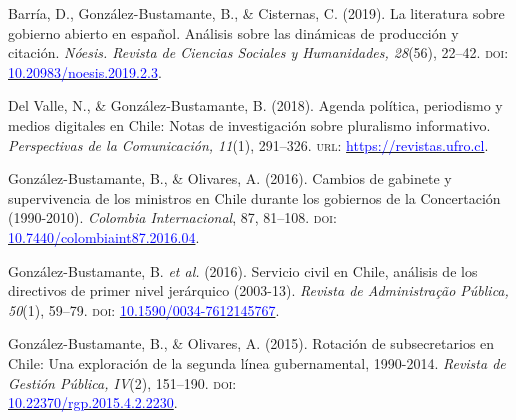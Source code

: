 \begin{publications}
\begin{benumerate}{9}
\item{\small Barría, D., González-Bustamante, B., \& Cisternas, C. (2019). La literatura sobre gobierno abierto en español. Análisis sobre las dinámicas de producción y citación. {\itshape Nóesis. Revista de Ciencias Sociales y Humanidades, 28}(56), 22--42. {\scshape doi}: \href{http://dx.doi.org/10.20983/noesis.2019.2.3}{\textcolor{blue}{10.20983/noesis.2019.2.3}}.}\vspace{1mm}

\item{\small Del Valle, N., \& González-Bustamante, B. (2018). Agenda política, periodismo y medios digitales en Chile: Notas de investigación sobre pluralismo informativo. {\itshape Perspectivas de la Comunicación, 11}(1), 291--326. {\scshape url:} \href{https://revistas.ufro.cl/ojs/index.php/perspectivas/article/view/1146}{\textcolor{blue}{https://revistas.ufro.cl}}.}\vspace{1mm}

\item{\small González-Bustamante, B., \& Olivares, A. (2016). Cambios de gabinete y supervivencia de los ministros en Chile durante los gobiernos de la Concertación (1990-2010). {\itshape Colombia Internacional}, 87, 81--108. {\scshape doi}: \\ \href{https://doi.org/10.7440/colombiaint87.2016.04}{\textcolor{blue}{10.7440/colombiaint87.2016.04}}.}\vspace{1mm}

\item{\small González-Bustamante, B. {\itshape et al.} (2016). Servicio civil en Chile, análisis de los directivos de primer nivel jerárquico (2003-13). {\itshape Revista de Administra\c{c}\~ao Pública, 50}(1), 59--79. {\scshape doi}: \href{http://dx.doi.org/10.1590/0034-7612145767}{\textcolor{blue}{10.1590/0034-7612145767}}.} \vspace{1mm}

\item{\small González-Bustamante, B., \& Olivares, A. (2015). Rotación de subsecretarios en Chile: Una exploración de la segunda línea gubernamental, 1990-2014. {\itshape Revista de Gestión Pública, IV}(2), 151--190. {\scshape doi}: \\ \href{https://doi.org/10.22370/rgp.2015.4.2.2230}{\textcolor{blue}{10.22370/rgp.2015.4.2.2230}}.} \vspace{1mm}

\end{benumerate}

\end{publications}

